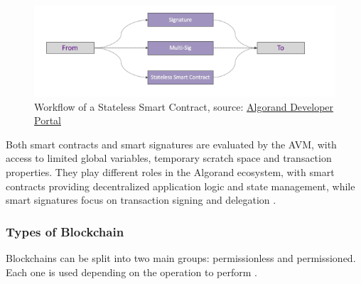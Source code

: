 \begin{figure}[htbp]
	\centering
	\includegraphics[scale=0.5]{figures/stateless.png}  %
	\caption{Workflow of a Stateless Smart Contract, source: \href{https://developer.algorand.org/articles/linking-algorand-stateful-and-stateless-smart-contracts/}{Algorand Developer Portal}}
	\label{fig:stateless}
\end{figure}

Both smart contracts and smart signatures are evaluated by the AVM, with access to limited global variables, temporary scratch space and transaction properties. They play different roles in the Algorand ecosystem, with smart contracts providing decentralized application logic and state management, while smart signatures focus on transaction signing and delegation \cite{scalgo, scalgo2}.

\subsubsection{Types of Blockchain}\label{typesofb}

Blockchains can be split into two main groups: permissionless and permissioned. Each one is used depending on the operation to perform \cite{perm_bc}.

